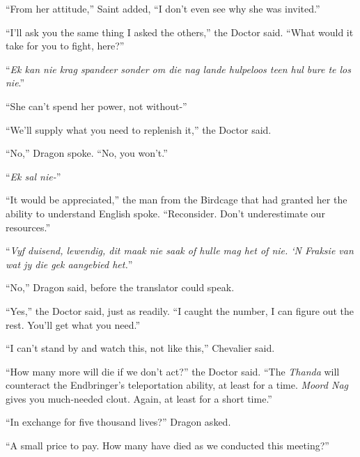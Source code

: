 ``From her attitude,'' Saint added, ``I don't even see why she was invited.''



``I'll ask you the same thing I asked the others,'' the Doctor said.  ``What would it take for you to fight, here?''



``\emph{Ek kan nie krag spandeer sonder om die nag lande hulpeloos teen hul bure te los nie}.''



``She can't spend her power, not without-''



``We'll supply what you need to replenish it,'' the Doctor said.



``No,'' Dragon spoke.  ``No, you won't.''



``\emph{Ek sal nie-}''



``It would be appreciated,'' the man from the Birdcage that had granted her the ability to understand English spoke.  ``Reconsider.  Don't underestimate our resources.''



``\emph{Vyf duisend, lewendig, dit maak nie saak of hulle mag het of nie.  `N Fraksie van wat jy die gek aangebied het.}''



``No,'' Dragon said, before the translator could speak.



``Yes,'' the Doctor said, just as readily.  ``I caught the number, I can figure out the rest.  You'll get what you need.''



``I can't stand by and watch this, not like this,'' Chevalier said.



``How many more will die if we don't act?'' the Doctor said.  ``The \emph{Thanda }will counteract the Endbringer's teleportation ability, at least for a time.  \emph{Moord Nag} gives you much-needed clout.  Again, at least for a short time.''



``In exchange for five thousand lives?'' Dragon asked.



``A small price to pay.  How many have died as we conducted this meeting?''



